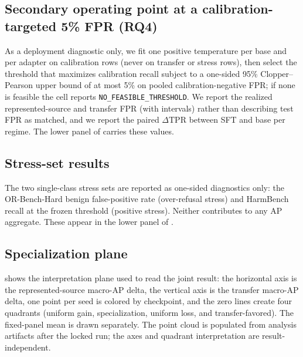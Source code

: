 \documentclass[sigconf,nonacm]{acmart}
\begin{document}
\subsection{Secondary operating point at a calibration-targeted 5\% FPR (RQ4)}
\label{subsec:operating-point}

As a deployment diagnostic only, we fit one positive temperature per base and per adapter on calibration rows (never on transfer or stress rows), then select the threshold that maximizes calibration recall subject to a one-sided 95\% Clopper--Pearson upper bound of at most 5\% on pooled calibration-negative FPR; if none is feasible the cell reports \texttt{NO\_FEASIBLE\_THRESHOLD}. We report the realized represented-source and transfer FPR (with intervals) rather than describing test FPR as matched, and we report the paired $\Delta\mathrm{TPR}$ between SFT and base per regime. The lower panel of  carries these values.

\subsection{Stress-set results}
\label{subsec:stress}

The two single-class stress sets are reported as one-sided diagnostics only: the OR-Bench-Hard benign false-positive rate (over-refusal stress) and HarmBench recall at the frozen threshold (positive stress). Neither contributes to any AP aggregate. These appear in the lower panel of .

\begin{table}[t]
\centering
\small
\setlength{\tabcolsep}{6pt}
\caption{Per-benchmark and operating-point sensitivity. Upper panel: per-source paired base-to-SFT AP delta for each represented and transfer benchmark. Lower panel: calibration-targeted 5\% FPR operating point (TPR and realized FPR, base vs.\ SFT) and single-class stress diagnostics. All values are filled from \texttt{artifacts/paper\_a\_sft/analysis} after the locked run.}
\label{tab:sensitivity}

\end{table}

\subsection{Specialization plane}
\label{subsec:plane}

 shows the interpretation plane used to read the joint result: the horizontal axis is the represented-source macro-AP delta, the vertical axis is the transfer macro-AP delta, one point per seed is colored by checkpoint, and the zero lines create four quadrants (uniform gain, specialization, uniform loss, and transfer-favored). The fixed-panel mean is drawn separately. The point cloud is populated from analysis artifacts after the locked run; the axes and quadrant interpretation are result-independent.
\end{document}
